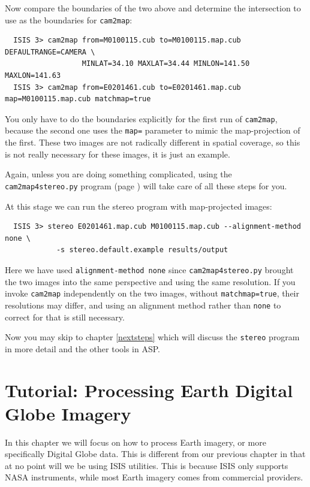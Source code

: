 Now compare the boundaries of the two above and determine the intersection to use as the boundaries for \texttt{cam2map}:

\begin{verbatim}
  ISIS 3> cam2map from=M0100115.cub to=M0100115.map.cub DEFAULTRANGE=CAMERA \
                  MINLAT=34.10 MAXLAT=34.44 MINLON=141.50 MAXLON=141.63
  ISIS 3> cam2map from=E0201461.cub to=E0201461.map.cub map=M0100115.map.cub matchmap=true
\end{verbatim}

You only have to do the boundaries explicitly for the first run of
\texttt{cam2map}, because the second one uses the \texttt{map=}
parameter to mimic the map-projection of the first.  These two
images are not radically different in spatial coverage, so this is not
really necessary for these images, it is just an example.

Again, unless you are doing something complicated, using the
\texttt{cam2map4stereo.py} program (page \pageref{cam2map4stereo})
will take care of all these steps for you.

At this stage we can run the stereo program with map-projected images:

\begin{verbatim}
  ISIS 3> stereo E0201461.map.cub M0100115.map.cub --alignment-method none \
            -s stereo.default.example results/output
\end{verbatim}

Here we have used \texttt{alignment-method none} since
\texttt{cam2map4stereo.py} brought the two images into the same
perspective and using the same resolution. If you invoke
\texttt{cam2map} independently on the two images, without
\texttt{matchmap=true}, their resolutions may differ, and using an
alignment method rather than \texttt{none} to correct for that is still
necessary.

Now you may skip to chapter \ref{nextsteps} which will discuss the
\texttt{stereo} program in more detail and the other tools in ASP.

\chapter{Tutorial: Processing Earth Digital Globe Imagery}
\label{ch:dg_tutorial}

In this chapter we will focus on how to process Earth imagery, or more
specifically Digital Globe data. This is different from our previous
chapter in that at no point will we be using ISIS utilities. This is
because ISIS only supports NASA instruments, while most Earth imagery
comes from commercial providers.

